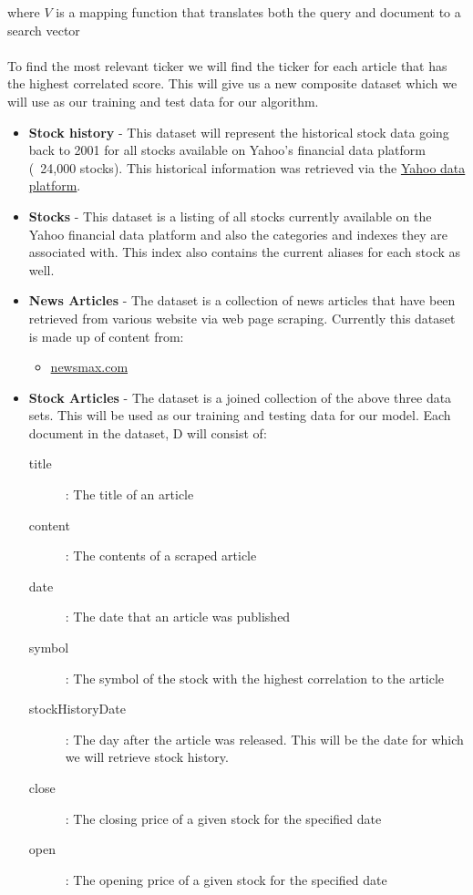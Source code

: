 \documentclass[11pt,letterpaper]{article}
\begin{document}
where \(V\) is a mapping function that translates both the query and document to a search vector \\ \\
 To find the most relevant ticker we will find the ticker for each article that has the highest correlated score.  This will give us a new composite dataset which we will use as our training and test data for our algorithm.
  \begin{itemize}
  	\item \textbf{Stock history}
		- This dataset will represent the historical stock data going back to 2001 for all stocks available on Yahoo's financial data platform (~24,000 stocks). This historical information was retrieved via the  \href{https://developer.yahoo.com/yql}{Yahoo data platform}.
	\item \textbf{Stocks}
		- This dataset is a listing of all stocks currently available on the Yahoo financial data platform and also the categories and indexes they are associated with.  This index also contains the current aliases for each stock as well.
	\item \textbf{News Articles}
		- The dataset is a collection of news articles that have been retrieved from various website via web page scraping.  Currently this dataset is made up of content from:
		\begin{itemize}
			\item \href{http://www.newsmax.com/archives/}{newsmax.com}
		\end{itemize}
	\item \textbf{Stock Articles}
		- The dataset is a joined collection of the above three data sets.  This will be used as our training and testing data for our model. Each document in the dataset, D will consist of:
		\begin{description}
			\item[title] : The title of an article
			\item[content] : The contents of a scraped article
			\item[date] : The date that an article was published
			\item[symbol] : The symbol of the stock with the highest correlation to the article
			\item[stockHistoryDate] : The day after the article was released.  This will be the date for which we will retrieve stock history.
			\item[close] : The closing price of a given stock for the specified date
			\item[open] : The opening price of a given stock for the specified date
		\end{description}
  \end{itemize}
\end{document}
